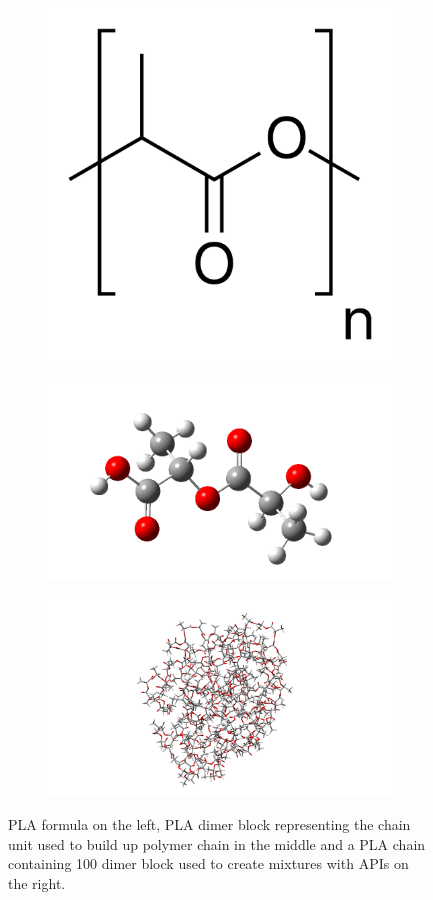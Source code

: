 \vspace{-0.5cm}
\begin{figure}[htb]
	\begin{subfigure}{0.3\textwidth}
		\centering
		\includegraphics[width=0.65\linewidth]{img/pla_vzorec.png} 
	\end{subfigure}
	\begin{subfigure}{0.3\textwidth}
		\includegraphics[width=1.2\linewidth]{img/pla_1d.png}
	\end{subfigure}
	\begin{subfigure}{0.33\textwidth}
		\includegraphics[width=1.4\linewidth]{img/pla_100g_tube.png}
	\end{subfigure}
	\caption{PLA formula on the left, PLA dimer block representing the chain unit used to build up polymer chain in the middle and a PLA chain containing 100 dimer block used to create mixtures with APIs on the right.}
	\vspace{-0.5cm}
	\label{fig:pla}
\end{figure}

